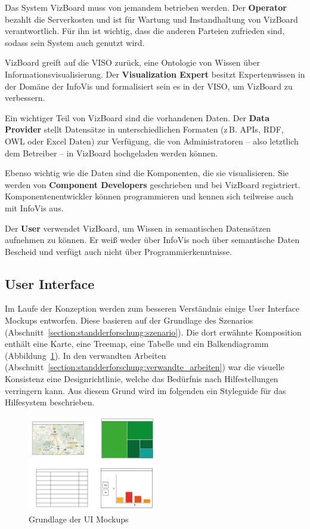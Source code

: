 \documentclass[
	headsepline,
	footsepline,
	fontsize=12pt,
	bibliography=totoc
]{scrbook}
\begin{document}
Das System VizBoard muss von jemandem betrieben werden. Der \textbf{Operator} bezahlt die Serverkosten und ist für Wartung und Instandhaltung von VizBoard verantwortlich. Für ihn ist wichtig, dass die anderen Parteien zufrieden sind, sodass sein System auch genutzt wird.

VizBoard greift auf die VISO zurück, eine Ontologie von Wissen über Informationsvisualisierung. Der \textbf{Visualization Expert} besitzt Expertenwissen in der Domäne der InfoVis und formalisiert sein es in der VISO, um VizBoard zu verbessern.

Ein wichtiger Teil von VizBoard sind die vorhandenen Daten. Der \textbf{Data Provider} stellt Datensätze in unterschiedlichen Formaten (z\,B. APIs, RDF, OWL oder Excel Daten) zur Verfügung, die von Administratoren -- also letztlich dem Betreiber -- in VizBoard hochgeladen werden können.

Ebenso wichtig wie die Daten sind die Komponenten, die sie visualisieren. Sie werden von \textbf{Component Developers} geschrieben und bei VizBoard registriert. Komponentenentwickler können programmieren und kennen sich teilweise auch mit InfoVis aus.

Der \textbf{User} verwendet VizBoard, um Wissen in semantischen Datensätzen aufnehmen zu können. Er weiß weder über InfoVis noch über semantische Daten Bescheid und verfügt auch nicht über Programmierkenntnisse.

\subsection{User Interface}
\label{section:konzeption:einfuehrung:ui}

Im Laufe der Konzeption werden zum besseren Verständnis einige User Interface Mockups entworfen. Diese basieren auf der Grundlage des Szenarios (Abschnitt~\ref{section:standderforschung:szenario}). Die dort erwähnte Komposition enthält eine Karte, eine Treemap, eine Tabelle und ein Balkendiagramm (Abbildung~\ref{figure:ui-grundlage}). In den verwandten Arbeiten (Abschnitt~\ref{section:standderforschung:verwandte_arbeiten}) war die visuelle Konsistenz eine Designrichtlinie, welche das Bedürfnis nach Hilfestellungen verringern kann. Aus diesem Grund wird im folgenden ein Styleguide für das Hilfesystem beschrieben.

\begin{figure}[htbp]
   \centering
   \includegraphics[width=0.5\textwidth]{images/konzeption-ui-grundlage.png}
   \caption{Grundlage der UI Mockups}
   \label{figure:ui-grundlage}
\end{figure}
\end{document}
